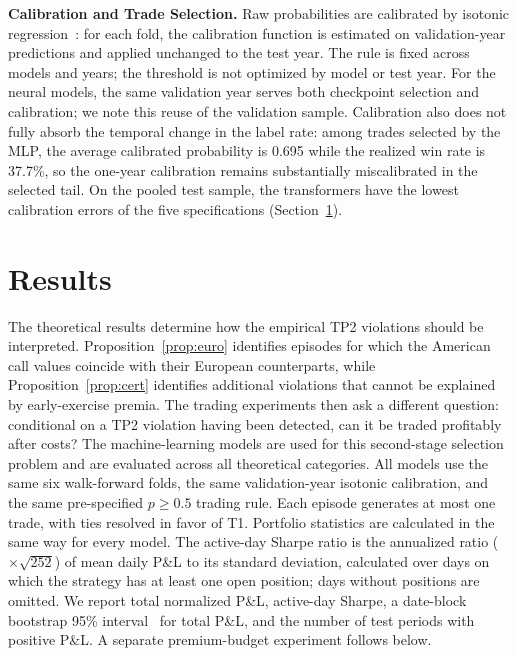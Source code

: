 \documentclass[sigconf,review,anonymous]{acmart}
\begin{document}
\smallskip\noindent\textbf{Calibration and Trade Selection.}
\label{sec:calibration}
Raw probabilities are calibrated by isotonic regression~\cite{zadrozny2002transforming}: for each fold, the calibration function is estimated on validation-year predictions and applied unchanged to the test year. The rule is fixed across models and years; the threshold is not optimized by model or test year.
For the neural models, the same validation year serves both checkpoint selection and calibration; we note this reuse of the validation sample. Calibration also does not fully absorb the temporal change in the label rate: among trades selected by the MLP, the average calibrated probability is 0.695 while the realized win rate is 37.7\%, so the one-year calibration remains substantially miscalibrated in the selected tail. On the pooled test sample, the transformers have the lowest calibration errors of the five specifications (Section~\ref{sec:results}).

\section{Results}
\label{sec:results}

The theoretical results determine how the empirical TP2 violations should be interpreted. Proposition~\ref{prop:euro} identifies episodes for which the American call values coincide with their European counterparts, while Proposition~\ref{prop:cert} identifies additional violations that cannot be explained by early-exercise premia. The trading experiments then ask a different question: conditional on a TP2 violation having been detected, can it be traded profitably after costs? The machine-learning models are used for this second-stage selection problem and are evaluated across all theoretical categories.
All models use the same six walk-forward folds, the same validation-year isotonic calibration, and the same pre-specified $p\ge0.5$ trading rule. Each episode generates at most one trade, with ties resolved in favor of T1. Portfolio statistics are calculated in the same way for every model. The active-day Sharpe ratio is the annualized ratio ($\times\sqrt{252}$) of mean daily P\&L to its standard deviation, calculated over days on which the strategy has at least one open position; days without positions are omitted. We report total normalized P\&L, active-day Sharpe, a date-block bootstrap 95\% interval~\cite{kunsch1989} for total P\&L, and the number of test periods with positive P\&L. A separate premium-budget experiment follows below.
\end{document}
